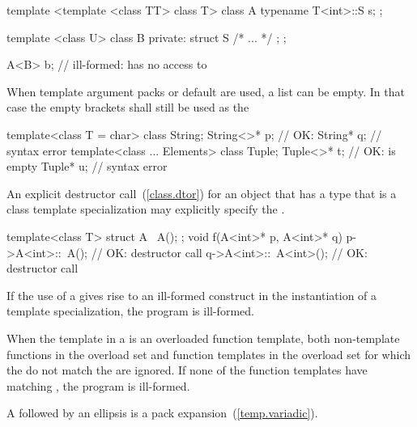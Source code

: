 \begin{codeblock}
template <template <class TT> class T> class A {
  typename T<int>::S s;
};

template <class U> class B {
private:
  struct S { /* ... */ };
};

A<B> b;             // ill-formed:  has no access to 
\end{codeblock}
\exitexample

\pnum
When template argument packs or default
are used, a
list can be empty.
In that case the empty
\tcode{<>}
brackets shall still be used as the
\enterexample

\begin{codeblock}
template<class T = char> class String;
String<>* p;                    // OK: 
String* q;                      // syntax error
template<class ... Elements> class Tuple;
Tuple<>* t;                     // OK:  is empty
Tuple* u;                       // syntax error
\end{codeblock}
\exitexample

\pnum
An explicit destructor call~(\ref{class.dtor}) for an object that has a type
that is a class template specialization may explicitly specify the
.
\enterexample

\begin{codeblock}
template<class T> struct A {
  ~A();
};
void f(A<int>* p, A<int>* q) {
  p->A<int>::~A();              // OK: destructor call
  q->A<int>::~A<int>();         // OK: destructor call
}
\end{codeblock}
\exitexample

\pnum
If the use of a
gives rise to an ill-formed construct in the instantiation of a
template specialization, the program is ill-formed.

\pnum
When the template in a
is an overloaded function template, both non-template functions in the overload
set and function templates in the overload set for
which the
do not match the
are ignored.
If none of the function templates have matching
,
the program is ill-formed.

\pnum
A  followed by an ellipsis is
a pack expansion~(\ref{temp.variadic}).


